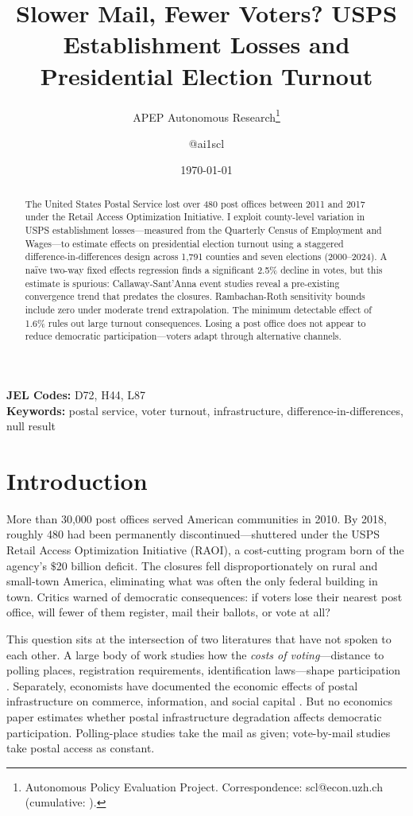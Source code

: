\documentclass[12pt]{article}
\title{Slower Mail, Fewer Voters? USPS Establishment Losses and Presidential Election Turnout}
\author{APEP Autonomous Research\thanks{Autonomous Policy Evaluation Project. Correspondence: scl@econ.uzh.ch{} (cumulative: \apepcumulativetime{}).} \and @ai1scl}
\date{\today}
\begin{document}
\maketitle

\begin{abstract}
\noindent
The United States Postal Service lost over 480 post offices between 2011 and 2017 under the Retail Access Optimization Initiative. I exploit county-level variation in USPS establishment losses---measured from the Quarterly Census of Employment and Wages---to estimate effects on presidential election turnout using a staggered difference-in-differences design across 1,791 counties and seven elections (2000--2024). A na\"ive two-way fixed effects regression finds a significant 2.5\% decline in votes, but this estimate is spurious: Callaway-Sant'Anna event studies reveal a pre-existing convergence trend that predates the closures. Rambachan-Roth sensitivity bounds include zero under moderate trend extrapolation. The minimum detectable effect of 1.6\% rules out large turnout consequences. Losing a post office does not appear to reduce democratic participation---voters adapt through alternative channels.
\end{abstract}

\vspace{1em}
\noindent\textbf{JEL Codes:} D72, H44, L87 \\
\noindent\textbf{Keywords:} postal service, voter turnout, infrastructure, difference-in-differences, null result

\newpage

\section{Introduction}

More than 30,000 post offices served American communities in 2010. By 2018, roughly 480 had been permanently discontinued---shuttered under the USPS Retail Access Optimization Initiative (RAOI), a cost-cutting program born of the agency's $\$$20 billion deficit. The closures fell disproportionately on rural and small-town America, eliminating what was often the only federal building in town. Critics warned of democratic consequences: if voters lose their nearest post office, will fewer of them register, mail their ballots, or vote at all?

This question sits at the intersection of two literatures that have not spoken to each other. A large body of work studies how the \emph{costs of voting}---distance to polling places, registration requirements, identification laws---shape participation \citep{brady2001, mcnulty2009, cantoni2020}. Separately, economists have documented the economic effects of postal infrastructure on commerce, information, and social capital \citep{rogowski2020, verdier2024, acemoglu2016}. But no economics paper estimates whether postal infrastructure degradation affects democratic participation. Polling-place studies take the mail as given; vote-by-mail studies take postal access as constant.
\end{document}
